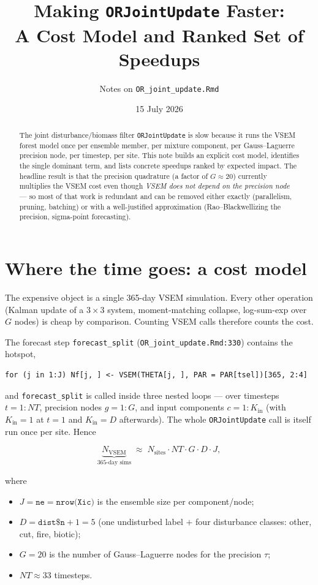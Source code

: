 \documentclass[11pt]{article}
\title{Making \texttt{ORJointUpdate} Faster:\\
A Cost Model and Ranked Set of Speedups}
\author{Notes on \texttt{OR\_joint\_update.Rmd}}
\date{15 July 2026}
\newcommand{\code}[1]{\texttt{#1}}
\begin{document}
\maketitle

\begin{abstract}
The joint disturbance/biomass filter \code{ORJointUpdate} is slow because it runs
the VSEM forest model once per ensemble member, per mixture component, per
Gauss--Laguerre precision node, per timestep, per site. This note builds an explicit
cost model, identifies the single dominant term, and lists concrete speedups ranked by
expected impact. The headline result is that the precision quadrature (a factor of
$G\!\approx\!20$) currently multiplies the VSEM cost even though \emph{VSEM does not
depend on the precision node} --- so most of that work is redundant and can be removed
either exactly (parallelism, pruning, batching) or with a well-justified approximation
(Rao--Blackwellizing the precision, sigma-point forecasting).
\end{abstract}

\section{Where the time goes: a cost model}
\label{sec:cost}

The expensive object is a single 365-day VSEM simulation. Every other operation
(Kalman update of a $3\times3$ system, moment-matching collapse, log-sum-exp over
$G$ nodes) is cheap by comparison. Counting VSEM calls therefore counts the cost.

The forecast step \code{forecast\_split} (\code{OR\_joint\_update.Rmd:330}) contains
the hotspot,
\begin{lstlisting}
for (j in 1:J) Nf[j, ] <- VSEM(THETA[j, ], PAR = PAR[tsel])[365, 2:4]
\end{lstlisting}
and \code{forecast\_split} is called inside three nested loops --- over timesteps
$t=1{:}NT$, precision nodes $g=1{:}G$, and input components $c=1{:}K_{\text{in}}$
(with $K_{\text{in}}=1$ at $t=1$ and $K_{\text{in}}=D$ afterwards). The whole
\code{ORJointUpdate} call is itself run once per site. Hence

\begin{equation}
\label{eq:cost}
\underbrace{N_{\text{VSEM}}}_{\text{365-day sims}}
\;\approx\;
N_{\text{sites}} \cdot NT \cdot G \cdot D \cdot J,
\end{equation}

where
\begin{itemize}[nosep]
  \item $J = \code{ne} = \code{nrow(Xic)}$ is the ensemble size per component/node;
  \item $D = \code{dist\$n}+1 = 5$ (one undisturbed label $+$ four disturbance
        classes: other, cut, fire, biotic);
  \item $G = 20$ is the number of Gauss--Laguerre nodes for the precision $\tau$;
  \item $NT \approx 33$ timesteps.
\end{itemize}
\end{document}
